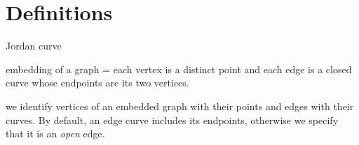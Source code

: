 \documentclass{patmorin}
\begin{document}
%
%
%
%
%
%




\section{Definitions}

Jordan curve

embedding of a graph = each vertex is a distinct point and each edge is a closed curve whose endpoints are its two vertices.  

we identify vertices of an embedded graph with their points and edges with their curves. By default, an edge curve includes its endpoints, otherwise we specify that it is an \emph{open} edge.
\end{document}
